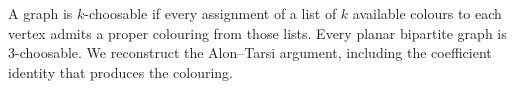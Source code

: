 A graph is $k$-choosable if every assignment of a list of $k$ available colours to each vertex admits a proper colouring from those lists. Every planar bipartite graph is 3-choosable. We reconstruct the Alon--Tarsi argument, including the coefficient identity that produces the colouring.
